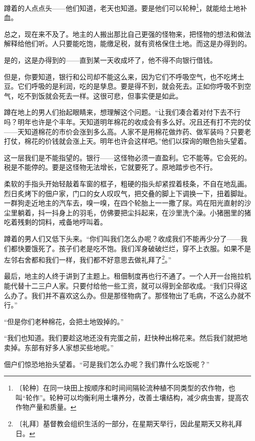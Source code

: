 \documentclass[12pt,UTF-8,openany]{ctexbook}
\begin{document}
    蹲着的人点点头——他们知道，老天也知道。要是他们可以轮种\footnote{〔轮种〕在同一块田上按顺序和时间间隔轮流种植不同类型的农作物，也叫“轮作”。轮种可以均衡利用土壤养分，改善土壤结构，减少病虫害，提高农作物产量和质量。}，就能给土地补血。
    
    总之，现在来不及了。地主的人搬出那比自己更强的怪物来，把怪物的想法和做法解释给他们听。人只要能吃饱，能缴足税，就有资格保住土地。而这是办得到的。
    
    是的，这是办得到的——直到某一天收成坏了，他不得不向银行借钱。
    
    但是，你要知道，银行和公司却不能这么来，因为它们不呼吸空气，也不吃烤土豆。它们呼吸的是利润，吃的是孳息。要是得不到，就会死去。正如你呼吸不到空气，吃不到饭就会死去一样。这很可悲，但事实便是如此。
    
    蹲在地上的男人们抬起眼睛来，想理解这个问题。“让我们凑合着对付下去不行吗？明年也许是个丰年。天知道明年棉花的收成会有多么好。况且还有打不完的仗——天知道棉花的市价会涨到多么高。人家不是用棉花做炸药、做军装吗？只要老打仗，棉花的价钱就会涨上天。明年也许会这样吧。”他们以探询的眼色抬头望着。
    
    这一层我们是不能指望的。银行——这怪物必须一直盈利。它不能等。它会死的。税是不能停的。要是这怪物无法增长，它就要死了。原地踏步也不行。
    
    柔软的手指头开始轻敲着车窗的框子，粗硬的指头却紧捏着枝条，不自在地乱画。烈日炙烤下的佃户家，门口的女人叹叹气，把交叠的脚上下调换一下，扭着脚趾。一群狗走近地主的汽车去，嗅一嗅，在四个轮胎上一一撒了尿。鸡在阳光直射的沙尘里躺着，抖一抖身上的羽毛，仿佛要把尘抖起来，在沙里洗个澡。小猪圈里的猪吃着残剩的饲料，戒备地哼叫着。
    
    蹲着的男人们又低下头来。“你们叫我们怎么办呢？收成我们不能再少分了——我们都快要饿死了。孩子们老是吃不饱。我们浑身破破烂烂，穿不上衣服。如果不是左邻右舍都和我们一样，我们都不好意思去做礼拜了\footnote{〔礼拜〕基督教会组织生活的一部分，在星期天举行，因此星期天又称礼拜日。}。”
    
    最后，地主的人终于讲到了主题上。租佃制度再也行不通了。一个人开一台拖拉机能代替十二三户人家。只要付给他一些工资，就可以得到全部收成。“我们只得这么办了。我们并不喜欢这么办。但是那怪物病了。那怪物出了毛病，不这么办就不行。”
    
    “但是你们老种棉花，会把土地毁掉的。”
    
    “我们也知道。我们要趁这地还没有完蛋之前，赶快种出棉花来。然后我们就把地卖掉。东部有好多人家想买些地呢。”
    
    佃户们惊恐地抬头望着。“可是我们怎么办呢？我们靠什么吃饭呢？”
    
\end{document}
